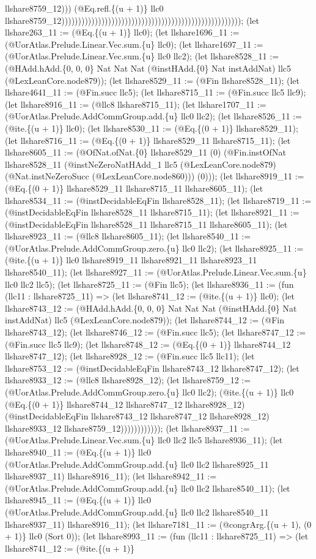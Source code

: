 \documentclass[11pt]{article}
\begin{document}
llshare8759\_12))) (@Eq.refl.\{(u + 1)\} llc0 llshare8759\_12)))))))))))))))))))))))))))))))))))))))))))))))))))))); (let llshare263\_11 := (@Eq.\{(u + 1)\} llc0); (let llshare1696\_11 := (@UorAtlas.Prelude.Linear.Vec.sum.\{u\} llc0); (let llshare1697\_11 := (@UorAtlas.Prelude.Linear.Vec.sum.\{u\} llc0 llc2); (let llshare8528\_11 := (@HAdd.hAdd.\{0, 0, 0\} Nat Nat Nat (@instHAdd.\{0\} Nat instAddNat) llc5 (@LexLeanCore.node879)); (let llshare8529\_11 := (@Fin llshare8528\_11); (let llshare4641\_11 := (@Fin.succ llc5); (let llshare8715\_11 := (@Fin.succ llc5 llc9); (let llshare8916\_11 := (@llc8 llshare8715\_11); (let llshare1707\_11 := (@UorAtlas.Prelude.AddCommGroup.add.\{u\} llc0 llc2); (let llshare8526\_11 := (@ite.\{(u + 1)\} llc0); (let llshare8530\_11 := (@Eq.\{(0 + 1)\} llshare8529\_11); (let llshare8716\_11 := (@Eq.\{(0 + 1)\} llshare8529\_11 llshare8715\_11); (let llshare8605\_11 := (@OfNat.ofNat.\{0\} llshare8529\_11 (0) (@Fin.instOfNat llshare8528\_11 (@instNeZeroNatHAdd\_1 llc5 (@LexLeanCore.node879) (@Nat.instNeZeroSucc (@LexLeanCore.node860))) (0))); (let llshare8919\_11 := (@Eq.\{(0 + 1)\} llshare8529\_11 llshare8715\_11 llshare8605\_11); (let llshare8534\_11 := (@instDecidableEqFin llshare8528\_11); (let llshare8719\_11 := (@instDecidableEqFin llshare8528\_11 llshare8715\_11); (let llshare8921\_11 := (@instDecidableEqFin llshare8528\_11 llshare8715\_11 llshare8605\_11); (let llshare8923\_11 := (@llc8 llshare8605\_11); (let llshare8540\_11 := (@UorAtlas.Prelude.AddCommGroup.zero.\{u\} llc0 llc2); (let llshare8925\_11 := (@ite.\{(u + 1)\} llc0 llshare8919\_11 llshare8921\_11 llshare8923\_11 llshare8540\_11); (let llshare8927\_11 := (@UorAtlas.Prelude.Linear.Vec.sum.\{u\} llc0 llc2 llc5); (let llshare8725\_11 := (@Fin llc5); (let llshare8936\_11 := (fun (llc11 : llshare8725\_11) => (let llshare8741\_12 := (@ite.\{(u + 1)\} llc0); (let llshare8743\_12 := (@HAdd.hAdd.\{0, 0, 0\} Nat Nat Nat (@instHAdd.\{0\} Nat instAddNat) llc5 (@LexLeanCore.node879)); (let llshare8744\_12 := (@Fin llshare8743\_12); (let llshare8746\_12 := (@Fin.succ llc5); (let llshare8747\_12 := (@Fin.succ llc5 llc9); (let llshare8748\_12 := (@Eq.\{(0 + 1)\} llshare8744\_12 llshare8747\_12); (let llshare8928\_12 := (@Fin.succ llc5 llc11); (let llshare8753\_12 := (@instDecidableEqFin llshare8743\_12 llshare8747\_12); (let llshare8933\_12 := (@llc8 llshare8928\_12); (let llshare8759\_12 := (@UorAtlas.Prelude.AddCommGroup.zero.\{u\} llc0 llc2); (@ite.\{(u + 1)\} llc0 (@Eq.\{(0 + 1)\} llshare8744\_12 llshare8747\_12 llshare8928\_12) (@instDecidableEqFin llshare8743\_12 llshare8747\_12 llshare8928\_12) llshare8933\_12 llshare8759\_12)))))))))))); (let llshare8937\_11 := (@UorAtlas.Prelude.Linear.Vec.sum.\{u\} llc0 llc2 llc5 llshare8936\_11); (let llshare8940\_11 := (@Eq.\{(u + 1)\} llc0 (@UorAtlas.Prelude.AddCommGroup.add.\{u\} llc0 llc2 llshare8925\_11 llshare8937\_11) llshare8916\_11); (let llshare8942\_11 := (@UorAtlas.Prelude.AddCommGroup.add.\{u\} llc0 llc2 llshare8540\_11); (let llshare8945\_11 := (@Eq.\{(u + 1)\} llc0 (@UorAtlas.Prelude.AddCommGroup.add.\{u\} llc0 llc2 llshare8540\_11 llshare8937\_11) llshare8916\_11); (let llshare7181\_11 := (@congrArg.\{(u + 1), (0 + 1)\} llc0 (Sort 0)); (let llshare8993\_11 := (fun (llc11 : llshare8725\_11) => (let llshare8741\_12 := (@ite.\{(u + 1)\} 
\end{document}
